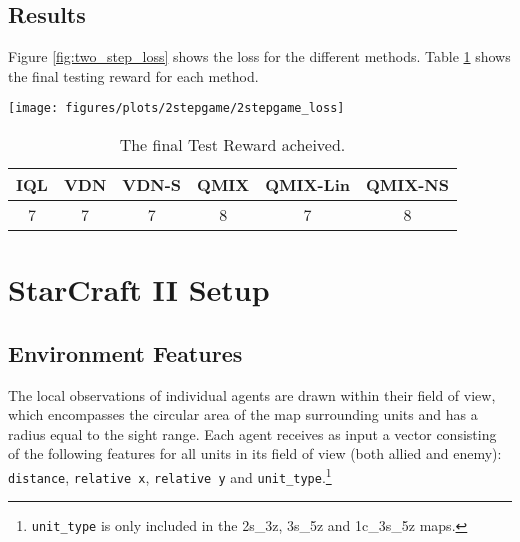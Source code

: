 \documentclass{article}
\begin{document}
\subsection{Results}

Figure \ref{fig:two_step_loss} shows the loss for the different methods. Table \ref{table:final_test_two_step} shows the final testing reward for each method.

\begin{figure*}[htb!]
    \centering
    \texttt{[image: figures/plots/2stepgame/2stepgame\_loss]}
    \caption{Loss for all six methods on the Two Step Game. The mean and 95\% confidence interval is shown across 30 independent runs.}
    \label{fig:two_step_loss}
\end{figure*}

\begin{table}[h]
	\setlength{\extrarowheight}{3pt}
	\centering
    \begin{center}
        \begin{tabular}{|c| c | c | c | c | c |}
        \hline
        \textbf{IQL} & \textbf{VDN} & \textbf{VDN-S} & \textbf{QMIX} & \textbf{QMIX-Lin} & \textbf{QMIX-NS} \\
        \hline
        7 & 7 & 7 & 8 & 7 & 8 \\
        \hline
        \end{tabular}
    \end{center}
    \caption{The final Test Reward acheived.}
    \label{table:final_test_two_step}
\end{table}
 \section{StarCraft II Setup}

\subsection{Environment Features}
The local observations of individual agents are drawn within their field of view, which encompasses the circular area of the map surrounding units and has a radius equal to the sight range. Each agent receives as input a vector consisting of the following features for all units in its field of view (both allied and enemy): \texttt{distance}, \texttt{relative x}, \texttt{relative y} and \texttt{unit\_type}.\footnote{\texttt{unit\_type} is only included in the 2s\_3z, 3s\_5z and 1c\_3s\_5z maps.} 
\end{document}
